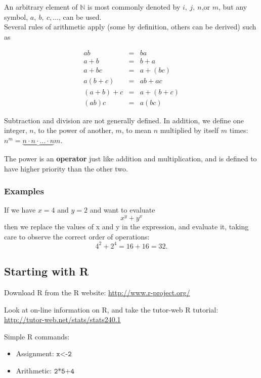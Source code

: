 \documentclass[12pt,a4paper]{article}
\theoremstyle{regla}
\theoremstyle{remark}
\theoremstyle{definition}
\theoremstyle{nonumberbreak}
\begin{document}
An arbitrary element of $\mathbb{N}$ is most commonly denoted by $i,\ j,\ n$,or $m$, but any symbol, $a,\ b,\ c, \ldots$, can be used.\\

Several rules of arithmetic apply (some by definition, others can be derived) such as

\begin{eqnarray*}
ab&=&ba\\
a+b&=&b+a\\
a+bc&=&a+(bc)\\
a(b+c)&=&ab+ac\\
(a+b)+c&=&a+(b+c)\\
(ab)c&=&a(bc)
\end{eqnarray*}

Subtraction and division are not generally defined. In addition, we define one integer, $n$, to the power of another, $m$, to mean $n$ multiplied by itself $m$ times: $n^m=\underbrace{n\cdot n \cdot \ldots \cdot n}{m}$. 

\begin{defn}
The power is an \textbf{operator} just like addition and multiplication, and is defined to have higher priority than the other two.
\end {defn}

\subsubsection{Examples}
\begin{xmpl} 
If we have $x=4$ and $y= 2$ and want to evaluate $$x^y+y^x$$
then we  replace the values of x and y in the expression, and evaluate it,
taking care to observe the correct order of operations:
$$4^2+2^4=16+16=32.$$
\end{xmpl} 


\subsection{Starting with R}
\begin{fbox}
\begin{minipage}{0.97\textwidth}
Download R from the R website: \href{http://www.r-project.org/}{http://www.r-project.org/}

Look at on-line information on R, and take the tutor-web R tutorial: \href{http://tutor-web.net/stats/stats240.1}{http://tutor-web.net/stats/stats240.1}

Simple R commands: 

\begin{itemize}
\item Assignment: $\texttt{x<-2}$
\item Arithmetic: $\texttt{2*5+4}$
\end{itemize}
\end{minipage}
\end{fbox}
\end{document}
